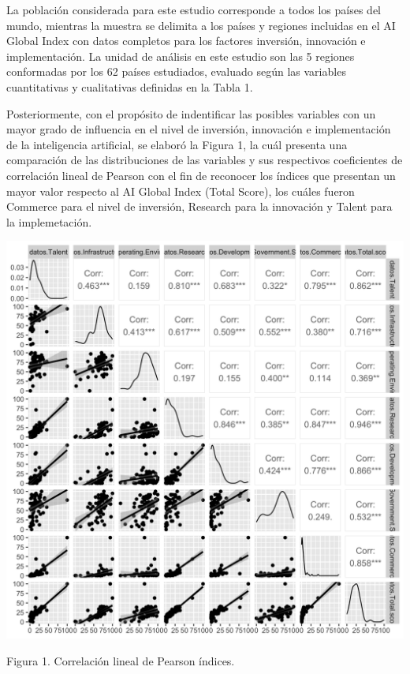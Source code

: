 \documentclass[
]{article}
\begin{document}
\begin{multicols}{2}

La población considerada para este estudio corresponde a todos los países del mundo, mientras la muestra se delimita a los países y regiones incluidas en el AI Global Index con datos completos para los factores inversión, innovación e implementación. La unidad de análisis en este estudio son las 5 regiones conformadas por los 62 países estudiados, evaluado según las variables cuantitativas y cualitativas definidas en la Tabla 1. 

Posteriormente, con el propósito de indentificar las posibles variables con un mayor grado de influencia en el nivel de inversión, innovación e implementación de la inteligencia artificial, se elaboró la Figura 1, la cuál presenta una comparación de las distribuciones de las variables y sus respectivos coeficientes de correlación lineal de Pearson con el fin de reconocer los índices que presentan un mayor valor respecto al AI Global Index (Total Score), los cuáles fueron Commerce para el nivel de inversión, Research para la innovación y Talent para la implemetación. 




\begin{center}
\includegraphics[width=\linewidth]{figura1.png}
\end{center}
Figura 1. Correlación lineal de Pearson índices.



\end{multicols}
\end{document}
